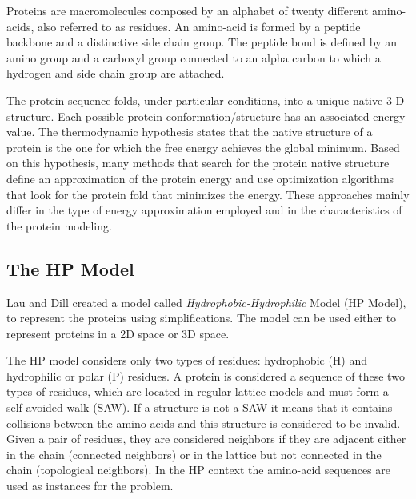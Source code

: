 \documentclass[conference]{IEEEtran}
\begin{document}
Proteins are macromolecules composed by an alphabet of twenty different amino-acids, also referred to as residues. An amino-acid is formed by a peptide backbone and a distinctive side chain group. The peptide bond is defined by an amino group and a carboxyl group connected to an alpha carbon to which a hydrogen and side chain group are attached.




The protein sequence folds, under particular conditions, into a unique native 3-D structure. Each possible protein conformation/structure has an associated energy value. The thermodynamic hypothesis states that the native structure of a protein is the one for which the free energy achieves the global minimum. Based on this hypothesis, many methods \cite{custodio2004investigation, hsu2003growth, krasnogor2002multimeme, lin2011protein, unger1993genetic} that search for the protein native structure define an approximation of the protein energy and use optimization algorithms that look for the protein fold that minimizes the energy. These approaches mainly differ in the type of energy approximation employed and in the characteristics of the protein modeling.


\subsection{The HP Model} \label{sec:hpModel}


 Lau and Dill \cite{lau1989lattice} created a model called \textit{Hydrophobic-Hydrophilic} Model (HP Model), to represent the proteins using simplifications. The model can be used either to represent proteins in a 2D space or 3D space.

The HP model considers only two types of residues:  hydrophobic (H) and hydrophilic or polar (P) residues. A protein is considered a sequence of these two types of residues, which are located in regular lattice models and must form a self-avoided walk (SAW). If a structure is not a SAW it means that it contains collisions between the amino-acids and this structure is considered to be invalid. Given a pair of residues, they are considered neighbors if they are adjacent  either in the chain (connected neighbors) or  in the lattice but not connected in the chain (topological neighbors). In the HP context the amino-acid sequences are used as instances for the problem.
\end{document}
